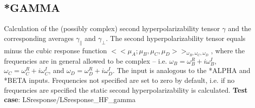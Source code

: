\subsection{*GAMMA}\label{subsec:gamma}
Calculation of the (possibly complex)  second hyperpolarizability tensor $\gamma$ and 
the corresponding averages $\gamma_{\parallel}$ and
$\gamma_{\perp}$. 
The second hyperpolarizability tensor equals minus the cubic response function
$<< \mu_A; \mu_B, \mu_C, \mu_D >>_{\omega_B, \omega_C, \omega_D}$, where
the frequencies are in general allowed to be complex --
i.e. $\omega_B = \omega_B^R + i \omega_B^I$,
$\omega_C = \omega_C^R + i \omega_C^I$, and
$\omega_D = \omega_D^R + i \omega_D^I$.
The input is analogous to the *ALPHA and *BETA inputs.
Frequencies not specified are set to zero by default,
i.e. if no frequencies are specified the static second hyperpolarizability is calculated. \newline
{\bf Test case}: LSresponse/LSresponse\_HF\_gamma 
